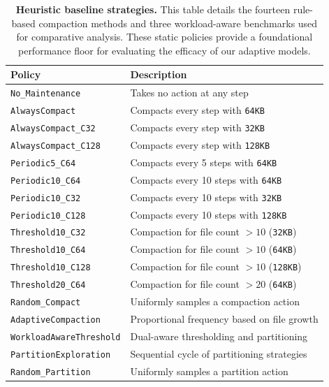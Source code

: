 \documentclass[fleqn,10pt]{wlscirep}
\begin{document}
\begin{table}[!htbp]
\centering
\renewcommand{\arraystretch}{0.85}
\begin{tabular}{lp{8cm}}
\toprule
\textbf{Policy} & \textbf{Description} \\
\midrule
\texttt{No\_Maintenance}          & Takes no action at any step \\
\texttt{AlwaysCompact}            & Compacts every step with \texttt{64KB} \\
\texttt{AlwaysCompact\_C32}       & Compacts every step with \texttt{32KB} \\
\texttt{AlwaysCompact\_C128}      & Compacts every step with \texttt{128KB} \\
\texttt{Periodic5\_C64}           & Compacts every 5 steps with \texttt{64KB} \\
\texttt{Periodic10\_C64}          & Compacts every 10 steps with \texttt{64KB} \\
\texttt{Periodic10\_C32}          & Compacts every 10 steps with \texttt{32KB} \\
\texttt{Periodic10\_C128}         & Compacts every 10 steps with \texttt{128KB} \\
\texttt{Threshold10\_C32}         & Compaction for file count $> 10$ (\texttt{32KB}) \\
\texttt{Threshold10\_C64}         & Compaction for file count $> 10$ (\texttt{64KB}) \\
\texttt{Threshold10\_C128}        & Compaction for file count $> 10$ (\texttt{128KB}) \\
\texttt{Threshold20\_C64}         & Compaction for file count $> 20$ (\texttt{64KB}) \\
\texttt{Random\_Compact}          & Uniformly samples a compaction action \\
\texttt{AdaptiveCompaction}       & Proportional frequency based on file growth \\
\midrule
\texttt{WorkloadAwareThreshold}   & Dual-aware thresholding and partitioning \\
\texttt{PartitionExploration}     & Sequential cycle of partitioning strategies \\
\texttt{Random\_Partition}        & Uniformly samples a partition action \\
\bottomrule
\end{tabular}
\caption{\label{tab:baselines}\textbf{Heuristic baseline strategies.} This table
details the fourteen rule-based compaction methods and three workload-aware benchmarks
used for comparative analysis. These static policies provide a foundational performance
floor for evaluating the efficacy of our adaptive models.}
\end{table}
\end{document}

